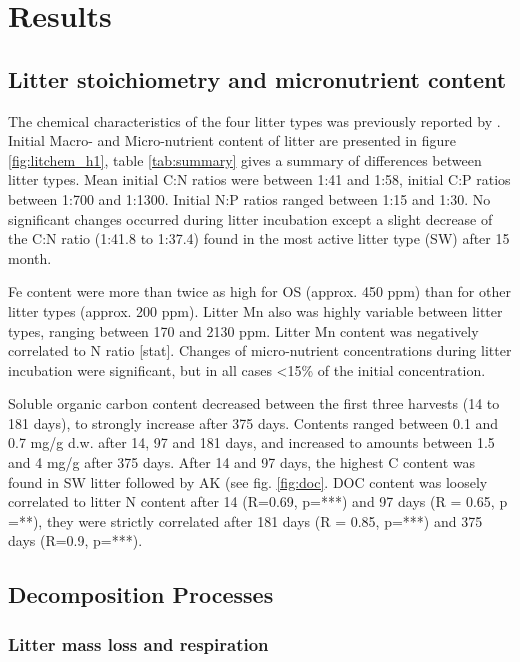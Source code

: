 \section{Results}
\subsection{Litter stoichiometry and micronutrient content}

The chemical characteristics of the four litter types was previously reported by \cite{Wanek2011}. Initial Macro- and Micro-nutrient content of litter are presented in figure \ref{fig:litchem_h1}, table \ref{tab:summary} gives a summary of differences between litter types. Mean initial C:N ratios were between 1:41 and 1:58, initial C:P ratios between 1:700 and 1:1300. Initial N:P ratios ranged between 1:15 and 1:30. No significant changes occurred during litter incubation except a slight decrease of the C:N ratio (1:41.8 to 1:37.4) found in the most active litter type (SW) after 15 month.

Fe content were more than twice as high for OS (approx. 450 ppm) than for other litter types (approx. 200 ppm). Litter Mn also was highly variable between litter types, ranging between 170 and 2130 ppm. Litter Mn content was negatively correlated to N ratio [stat]. Changes of micro-nutrient concentrations during litter incubation were significant, but in all cases \textless 15\% of the initial concentration.

Soluble organic carbon content decreased between the first three harvests (14 to 181 days), to strongly increase after 375 days. Contents ranged between 0.1 and 0.7 mg/g d.w. after 14, 97 and 181 days, and increased to amounts between 1.5 and 4 mg/g after 375 days. After 14 and 97 days, the highest C content was found in SW litter followed by AK (see fig. \ref{fig:doc}. DOC content was loosely correlated to litter N content after 14 (R=0.69, p=***) and 97 days (R = 0.65, p =**), they were strictly correlated after 181 days (R = 0.85, p=***) and 375 days (R=0.9, p=***). 

\subsection{Decomposition Processes}

\subsubsection{Litter mass loss and respiration}

